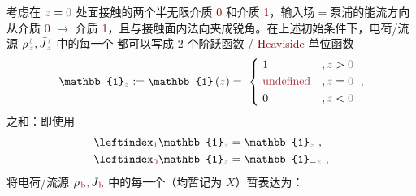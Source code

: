 考虑在 $\mathcolor{gray}{z} = \mathcolor{gray}{0}$ 处面接触的两个半无限介质 \textcolor{Maroon}{0} 和介质 \textcolor{Maroon}{1}，输入场$=$泵浦的能流方向从介质 \textcolor{Maroon}{0} $\to$ 介质 \textcolor{Maroon}{1}，且与接触面内法向夹成锐角。在上述初始条件下，电荷/流源 ${\rho}^{\;\!\mathcolor{gray}{t}}_{\;\!\mathcolor{gray}{z}}, \bar{J}^{\;\!\mathcolor{gray}{t}}_{\;\!\mathcolor{gray}{z}}$ 中的每一个 都可以写成 2 个阶跃函数 / \textcolor{Maroon}{Heaviside} 单位函数
\begin{align} \label{eq:u}
	\mathbb{1}_{\mathcolor{gray}{z}} := \mathbb{1} \left( \mathcolor{gray}{z} \right) = ~\left\{~ \begin{aligned} 
		&1 &&, \mathcolor{gray}{z \mathcolor{black}{>} 0} \\ 
		&\textcolor{Maroon}{\text{undefined}} &&, \mathcolor{gray}{z \mathcolor{black}{=} 0} \\
		&0 &&, \mathcolor{gray}{z \mathcolor{black}{<} 0} \end{aligned}\right. ~,
\end{align}
之和：即使用
\begin{subequations} \label{eq:u-01}
	\abovedisplayskip=0pt
\begin{align}
	\leftindex_{\textcolor{Maroon}{1}} {\mathbb{1}}_{\mathcolor{gray}{z}} &= {\mathbb{1}}_{\mathcolor{gray}{z}} ~, \label{eq:u-1} \\ 
	\leftindex_{\textcolor{Maroon}{0}} {\mathbb{1}}_{\mathcolor{gray}{z}} &= {\mathbb{1}}_{ - \mathcolor{gray}{z} } ~, \label{eq:u-0}
\end{align}
\end{subequations}
将电荷/流源 $\rho_{\;\!\textcolor{Maroon}{\text{b}}}, J_{\;\!\textcolor{Maroon}{\text{b}}}$ 中的每一个（均暂记为 $X$）暂表达为：
